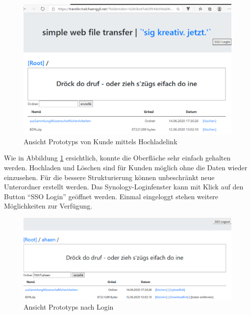 \begin{figure}[!h]
    \centering
    \includegraphics[width=1\linewidth]{content/images/prototyp_nichteingeloggt.png}
    \caption{Ansicht Prototyps von Kunde mittels Hochladelink}
    \label{fig:Prototyp_Hochladelink}
\end{figure}

Wie in Abbildung \ref{fig:Prototyp_Hochladelink} ersichtlich, konnte die Oberfläche sehr einfach gehalten werden.
Hochladen und Löschen sind für Kunden möglich ohne die Daten wieder einzusehen. Für die bessere Strukturierung können unbeschränkt neue Unterordner erstellt werden.
Das Synology-Loginfenster kann mit Klick auf den Button ``SSO Login'' geöffnet werden.
Einmal eingeloggt stehen weitere Möglichkeiten zur Verfügung. 

\begin{figure}[!h]
    \centering
    \includegraphics[width=1\linewidth]{content/images/prototyp_eingeloggt.png}
    \caption{Ansicht Prototyps nach Login}
    \label{fig:Prototyp_Migrator}
\end{figure}

